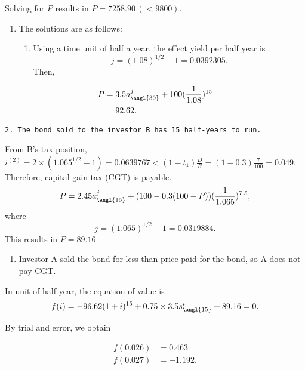 \documentclass[
]{article}
\providecommand{\tightlist}{%
  \setlength{\itemsep}{0pt}\setlength{\parskip}{0pt}}
\theoremstyle{definition}
\theoremstyle{definition}
\theoremstyle{definition}
\theoremstyle{definition}
\theoremstyle{remark}
\begin{document}
Solving for \(P\) results in \(P = 7258.90 \,( <9800)\).

\begin{enumerate}
\def\labelenumi{\arabic{enumi}.}
\setcounter{enumi}{4}
\item
  The solutions are as follows:

  \begin{enumerate}
  \def\labelenumii{\arabic{enumii}.}
  \tightlist
  \item
    Using a time unit of half a year, the effect yield per half year is
    \[j = (1.08)^{1/2} - 1 = 0.0392305.\]
    Then,
  \end{enumerate}
\end{enumerate}

\[
\begin{aligned}
P &= 3.5 a^j_{\angl{30}} + 100 (\frac{1}{1.08})^{15} \\
&= 92.62.
\end{aligned}
\]

\begin{verbatim}
2. The bond sold to the investor B has 15 half-years to run.
\end{verbatim}

From B's tax position,
\(i^{(2)} = 2 \times (1.065^{1/2} - 1) = 0.0639767 < (1 - t_1)\frac{D}{R} = (1 - 0.3)\frac{7}{100} = 0.049.\)
Therefore, capital gain tax (CGT) is payable.
\[
\begin{aligned}
P &= 2.45 a^j_{\angl{15}} + (100 - 0.3(100-P)) (\frac{1}{1.065})^{7.5}, \\
\end{aligned}
\]
where \[j = (1.065)^{1/2} - 1 = 0.0319884.\]
This results in \(P = 89.16\).

\begin{enumerate}
\def\labelenumi{\arabic{enumi}.}
\setcounter{enumi}{2}
\tightlist
\item
  Investor A sold the bond for less than price paid for the bond, so A does not pay CGT.
\end{enumerate}

In unit of half-year, the equation of value is
\[ f(i) = -96.62 (1 + i)^{15} + 0.75 \times 3.5  s^i_{\angl{15}} + 89.16 = 0.\]

By trial and error, we obtain

\[
\begin{aligned}
f(0.026) &= 0.463 \\
f(0.027) &= -1.192. \\
\end{aligned}
\]
\end{document}
